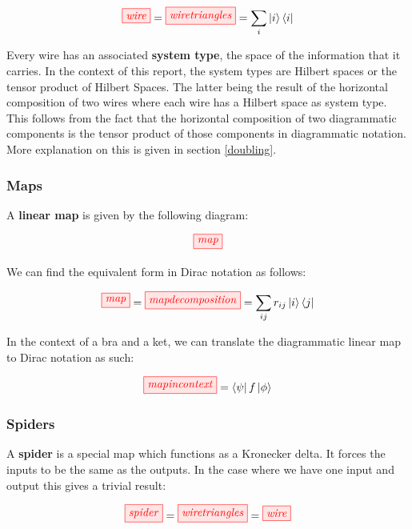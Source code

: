 \documentclass[]{article}
\begin{document}
\begin{equation}
\label{equation:wiredecomposed}
\tikzfig{wire} = \tikzfig{wiretriangles} = \sum_{i}\ket{i}\bra{i}
\end{equation}

Every wire has an associated \textbf{system type}, the space of the information that it carries. In the context of this report, the system types are Hilbert spaces or the tensor product of Hilbert Spaces. The latter being the result of the horizontal composition of two wires where each wire has a Hilbert space as system type. This follows from the fact that the horizontal composition of two diagrammatic components is the tensor product of those components in diagrammatic notation. More explanation on this is given in section \ref{doubling}.

\subsubsection{Maps}
\label{maps}

A \textbf{linear map} is given by the following diagram:

\begin{equation}
\tikzfig{map}
\end{equation}

We can find the equivalent form in Dirac notation as follows:

\begin{equation}
\tikzfig{map} = \tikzfig{mapdecomposition} = \sum_{ij}r_{ij}\ket{i}\bra{j}
\end{equation}

In the context of a bra and a ket, we can translate the diagrammatic linear map to Dirac notation as such:

\begin{equation}
\tikzfig{mapincontext} = \bra{\psi}f\ket{\phi}
\end{equation}

\subsubsection{Spiders}
\label{spiders}

A \textbf{spider} is a special map which functions as a Kronecker delta. It forces the inputs to be the same as the outputs. In the case where we have one input and output this gives a trivial result:

\begin{equation}
\tikzfig{spider} = \tikzfig{wiretriangles} = \tikzfig{wire}
\end{equation}
\end{document}
